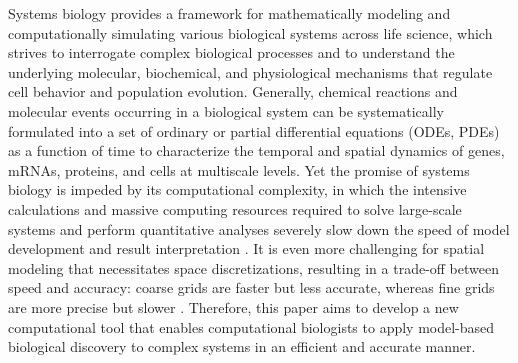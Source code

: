 Systems biology provides a framework for mathematically modeling and computationally simulating various biological systems across life science, which strives to interrogate complex biological processes and to understand the underlying molecular, biochemical, and physiological mechanisms that regulate cell behavior and population evolution.  
Generally, chemical reactions and molecular events occurring in a biological system can be systematically formulated into a set of ordinary or partial differential equations (ODEs, PDEs) as a function of time to characterize the temporal and spatial dynamics of genes, mRNAs, proteins, and cells at multiscale levels. 
Yet the promise of systems biology is impeded by its computational complexity, in which the intensive calculations and massive computing resources required to solve large-scale systems and perform quantitative analyses severely slow down the speed of model development and result interpretation \cite{bartocci2016computational, anantharaman2021stably}. 
It is even more challenging for spatial modeling that necessitates space discretizations, resulting in a trade-off between speed and accuracy: coarse grids are faster but less accurate, whereas fine grids are more precise but slower \cite{li2020multipole}. 
Therefore, this paper aims to develop a new computational tool that  enables computational biologists to apply model-based biological discovery to complex systems in an efficient and accurate manner.


